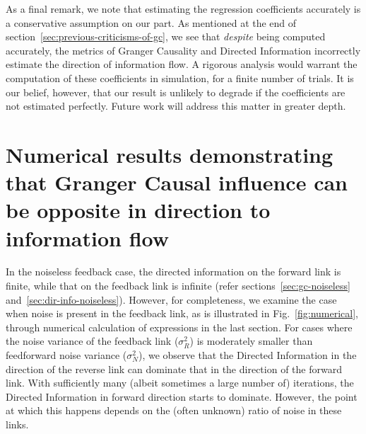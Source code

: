 \documentclass[letterpaper, 10pt, conference]{ieeeconf}
\begin{document}
As a final remark, we note that estimating the regression coefficients accurately is a conservative assumption on our part. As mentioned at the end of section~\ref{sec:previous-criticisms-of-gc}, we see that \emph{despite} being computed accurately, the metrics of Granger Causality and Directed Information incorrectly estimate the direction of information flow. A rigorous analysis would warrant the computation of these coefficients in simulation, for a finite number of trials. It is our belief, however, that our result is unlikely to degrade if the coefficients are not estimated perfectly. Future work will address this matter in greater depth.


\section{Numerical results demonstrating that Granger Causal influence can be opposite in direction to information flow}
\label{sec:numerical-results}
In the noiseless feedback case, the directed information on the forward link is finite, while that on the feedback link is infinite (refer sections~\ref{sec:gc-noiseless} and~\ref{sec:dir-info-noiseless}). However, for completeness, we examine the case when noise is present in the feedback link, as is illustrated in Fig.~\ref{fig:numerical}, through numerical calculation of expressions in the last section. For cases where the noise variance of the feedback link ($\sigma_R^2$) is moderately smaller than feedforward noise variance ($\sigma_N^2$), we observe that the Directed Information in the direction of the reverse link can dominate that in the direction of the forward link. With sufficiently many (albeit sometimes a large number of) iterations, the Directed Information in forward direction starts to dominate. However, the point at which this happens depends on the (often unknown) ratio of noise in these links.
\end{document}
